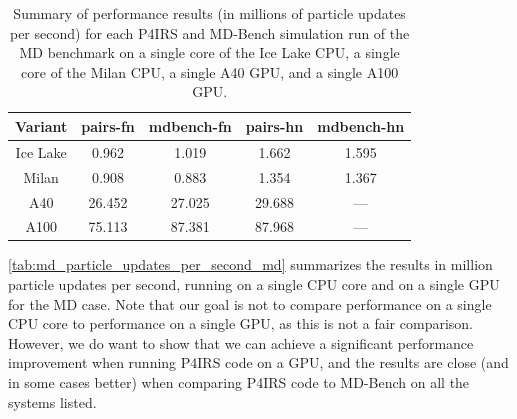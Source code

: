 \documentclass[Afour,sageh,times]{sagej}
\newcommand{\RMchange}[1]{{\color{blue} #1}}
\begin{document}
\begin{table}[htb]
    \centering
    \begin{tabular}{c|c|c|c|c}
        Variant & pairs-fn & mdbench-fn & pairs-hn & mdbench-hn \\
        \hline
        Ice Lake & 0.962 & 1.019 & 1.662 & 1.595 \\
        Milan & 0.908 & 0.883 & 1.354 & 1.367 \\
        A40  & 26.452 & 27.025 & 29.688 & --- \\
        A100 & 75.113 & 87.381 & 87.968 & --- \\
    \end{tabular}
    \caption{\RMchange{Summary of performance results (in millions of particle updates per second) for each P4IRS and MD-Bench simulation run of the MD benchmark on a single core of the Ice Lake CPU, a single core of the Milan CPU, a single A40 GPU, and a single A100 GPU.}}
    \label{tab:md_particle_updates_per_second_md}
\end{table}

\RMchange{\autoref{tab:md_particle_updates_per_second_md} summarizes the results in million particle updates per second, running on a single CPU core and on a single GPU for the \ac{MD} case.
Note that our goal is not to compare performance on a single CPU core to performance on a single GPU, as this is not a fair comparison.
However, we do want to show that we can achieve a significant performance improvement when running P4IRS code on a GPU, and the results are close (and in some cases better) when comparing P4IRS code to MD-Bench on all the systems listed.}
\end{document}
